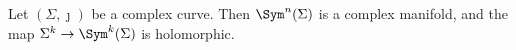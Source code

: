 

    Let $(\Sigma, \jmath)$ be a complex curve. Then $\Sym^n(\Sigma)$ is a complex manifold, and the map $\Sigma^k\to \Sym^k(\Sigma)$ is holomorphic.
